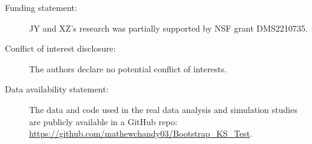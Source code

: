 \documentclass[12pt]{article}
\begin{document}
\begin{description}

\item[Funding statement:]JY and XZ's research was partially supported by NSF grant
DMS2210735.

\item[Conflict of interest disclosure:]The authors declare no potential conflict
of interests.

\item[Data availability statement:] The data and code used in the real data analysis and simulation
studies are publicly available in a GitHub repo:
\url{https://github.com/mathewchandy03/Bootstrap_KS_Test}.

\end{description}



\end{document}
